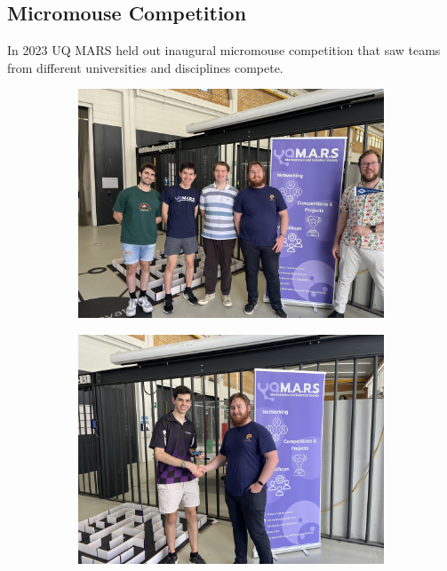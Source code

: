 \documentclass[a4paper,12pt]{report}
\begin{document}
\subsection{Micromouse Competition} 
 In 2023 UQ MARS held out inaugural micromouse competition that saw teams from different universities and disciplines compete.
\begin{figure}[H]
    \centering
    \begin{subfigure}{0.32\linewidth}
        \includegraphics[width=0.99\linewidth]{prospectus/2024/Photos/ExecMouse.jpg}
    \end{subfigure}
    \begin{subfigure}{0.32\linewidth}
        \includegraphics[width=0.99\linewidth]{prospectus/2024/Photos/Goat.jpg}

\end{subfigure}
\end{figure}
\end{document}
